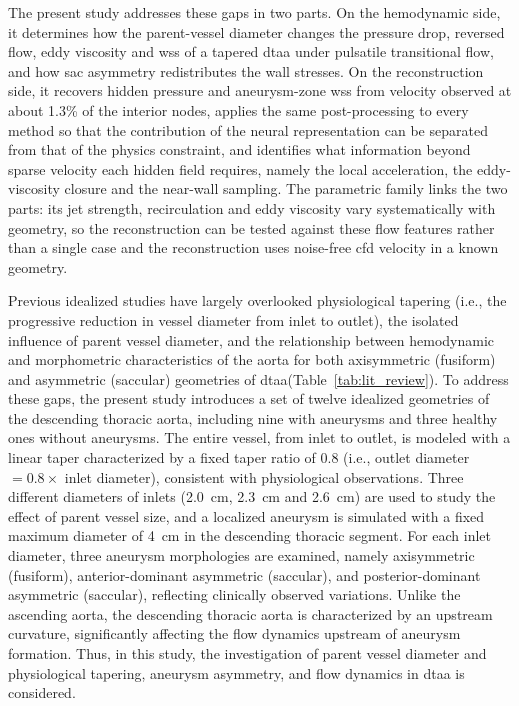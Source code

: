\documentclass[12pt,a4paper]{article}
\newcommand{\CFD}{\ac{cfd}\xspace}
\newcommand{\DTAA}{\ac{dtaa}\xspace}
\newcommand{\WSS}{\ac{wss}\xspace}
\theoremstyle{definition}
\numberwithin{equation}{section}
\begin{document}
The present study addresses these gaps in two parts. On the hemodynamic side, it determines how the parent-vessel diameter changes the pressure drop, reversed flow, eddy viscosity and \WSS of a tapered \DTAA under pulsatile transitional flow, and how sac asymmetry redistributes the wall stresses. On the reconstruction side, it recovers hidden pressure and aneurysm-zone \WSS from velocity observed at about 1.3\% of the interior nodes, applies the same post-processing to every method so that the contribution of the neural representation can be separated from that of the physics constraint, and identifies what information beyond sparse velocity each hidden field requires, namely the local acceleration, the eddy-viscosity closure and the near-wall sampling. The parametric family links the two parts: its jet strength, recirculation and eddy viscosity vary systematically with geometry, so the reconstruction can be tested against these flow features rather than a single case and the reconstruction uses noise-free \CFD velocity in a known geometry.















\iffalse Previous idealized studies have largely overlooked physiological tapering (i.e., the progressive reduction in vessel diameter from inlet to outlet), the isolated influence of parent vessel diameter, and the relationship between hemodynamic and morphometric characteristics of the aorta for both axisymmetric (fusiform) and asymmetric (saccular) geometries of \DTAA (Table~\ref{tab:lit_review}). To address these gaps, the present study introduces a set of twelve idealized geometries of the descending thoracic aorta, including nine with aneurysms and three healthy ones without aneurysms. The entire vessel, from inlet to outlet, is modeled with a linear taper characterized by a fixed taper ratio of 0.8 (i.e., outlet diameter $= 0.8 \times$ inlet diameter), consistent with physiological observations. Three different diameters of inlets (2.0~cm, 2.3~cm and 2.6~cm) are used to study the effect of parent vessel size, and a localized aneurysm is simulated with a fixed maximum diameter of 4~cm in the descending thoracic segment. For each inlet diameter, three aneurysm morphologies are examined, namely axisymmetric (fusiform), anterior-dominant asymmetric (saccular), and posterior-dominant asymmetric (saccular), reflecting clinically observed variations. Unlike the ascending aorta, the descending thoracic aorta is characterized by an upstream curvature, significantly affecting the flow dynamics upstream of aneurysm formation. Thus, in this study, the investigation of parent vessel diameter and physiological tapering, aneurysm asymmetry, and flow dynamics in \DTAA is considered.
\end{document}
